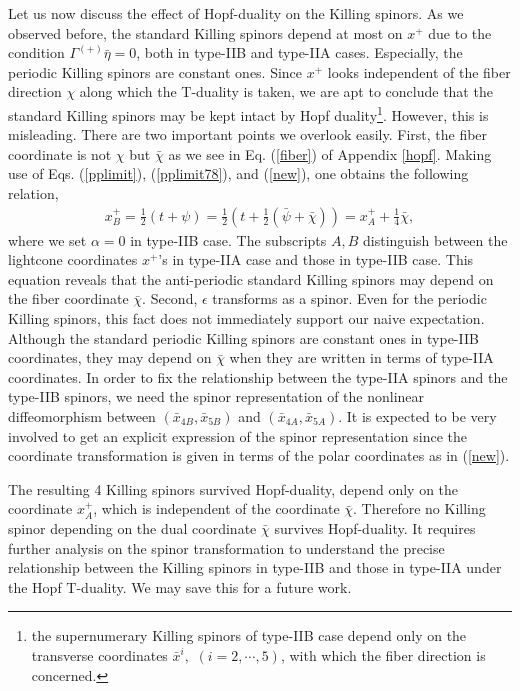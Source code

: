 \documentclass[a4paper,12pt]{article}
\begin{document}
Let us now discuss the effect of Hopf-duality on the Killing spinors. 
As we observed before, the standard Killing spinors depend at most on $x^+$ due to the condition $\Gamma^{(+)}\bar{\eta}= 0$, both in type-IIB and type-IIA cases. Especially, the periodic Killing spinors are constant ones. Since $x^+$ looks independent of the fiber direction $\chi$ along which the T-duality is taken, we are apt to conclude that the standard Killing spinors may be kept intact by Hopf duality\footnote{the supernumerary Killing spinors of type-IIB case depend only on the transverse coordinates $\bar{x}^i,\,\,(i=2,\cdots,5)$, with which the fiber direction is concerned.}. 
However, this is misleading. There are two important points we overlook easily.
First, the fiber coordinate is not $\chi$ but $\bar{\chi}$ as we see in Eq. (\ref{fiber}) of Appendix \ref{hopf}. Making use of Eqs. (\ref{pplimit}), (\ref{pplimit78}), and (\ref{new}), one obtains the following relation,
\begin{eqnarray}
x^+_B=\frac{1}{2}\left(t+\psi\right)
=\frac{1}{2}\left(t+\frac{1}{2}\left(\bar{\psi}+\bar{\chi}\right)\right)
=x^+_A+\frac{1}{4}\bar{\chi},
\end{eqnarray}
where we set $\alpha=0$ in type-IIB case. The subscripts $A, B$ distinguish between the lightcone coordinates $x^+$'s in type-IIA case and those in type-IIB case. This equation reveals that the anti-periodic standard Killing spinors may depend on the fiber coordinate ${\bar \chi}$. Second, $\epsilon$ transforms as a spinor. Even for the periodic Killing spinors, this fact does not immediately support our naive expectation. Although the standard periodic Killing spinors are constant ones in type-IIB coordinates, they may depend on $\bar{\chi}$ when they are written in terms of type-IIA coordinates. In order to fix the relationship between the type-IIA spinors and the type-IIB spinors, we need the spinor representation of the nonlinear diffeomorphism between $(\bar{x}_{4B}, \bar{x}_{5B})$ and $(\bar{x}_{4A}, \bar{x}_{5A})$. It is expected to be very involved to get an explicit expression of the spinor representation since the coordinate transformation is given in terms of the polar coordinates as in (\ref{new}).  

The resulting 4 Killing spinors survived Hopf-duality, depend only on the coordinate $x^+_A$, which is independent of the coordinate $\bar{\chi}$. Therefore no Killing spinor depending on the dual coordinate $\bar{\chi}$ survives Hopf-duality. It requires further analysis on the spinor transformation to understand the precise relationship between the Killing spinors in type-IIB and those in type-IIA under the Hopf T-duality. We may save this for a future work. 
\end{document}

